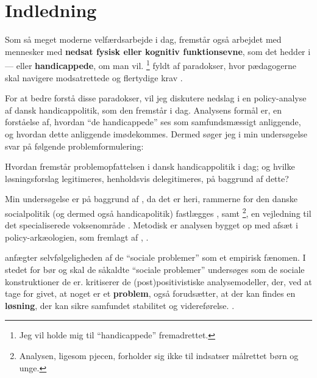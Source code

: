 \section{Indledning}

Som så meget moderne velfærdsarbejde i dag, fremstår også arbejdet med mennesker med \textbf{nedsat fysisk eller kognitiv funktionsevne}, som det hedder i  — eller \textbf{handicappede}, om man vil. \footnote{Jeg vil holde mig til “handicappede” fremadrettet.} fyldt af paradokser, hvor pædagogerne skal navigere modsatrettede og flertydige krav \autocite{mik-meyerIndledningSkabeProfessionel2012}.

For at bedre forstå disse paradokser, vil jeg diskutere nedslag i en policy-analyse af dansk handicappolitik, som den fremstår i dag.
Analysens formål er, en forståelse af, hvordan “de handicappede” ses som samfundsmæssigt anliggende, og hvordan dette anliggende imødekommes.
Dermed søger jeg i min undersøgelse svar på følgende problemformulering:

Hvordan fremstår problemopfattelsen i dansk handicappolitik i dag; og hvilke løsningsforslag legitimeres, henholdsvis delegitimeres, på baggrund af dette?

Min undersøgelse er på baggrund af , da det er heri, rammerne for den danske socialpolitik (og dermed også handicapolitik) fastlægges \autocite[kapitel 2]{social-ogindenrigsministerietBekendtgorelseAfLov2019}, samt \footnote{Analysen, ligesom pjecen, forholder sig ikke til indsatser målrettet børn og unge.}, en vejledning til det specialiserede voksenområde \autocite{klStyringAfDet2017}.
Metodisk er analysen bygget op med afsæt i policy-arkæologien, som fremlagt af \citeauthor{scheurichPolicyArchaeologyNew1994}, \citeyear{scheurichPolicyArchaeologyNew1994}.

\citeauthor{scheurichPolicyArchaeologyNew1994} anfægter selvfølgeligheden af de “sociale problemer” som et empirisk fænomen.
I stedet for bør og skal de såkaldte “sociale problemer” undersøges som de sociale konstruktioner de er.
\citeauthor{scheurichPolicyArchaeologyNew1994} kritiserer de (post)positivistiske analysemodeller, der, ved at tage for givet, at noget er et \textbf{problem}, også forudsætter, at der kan findes en \textbf{løsning}, der kan sikre samfundet stabilitet og videreførelse. \autocite[ss. 298-299]{scheurichPolicyArchaeologyNew1994}.

